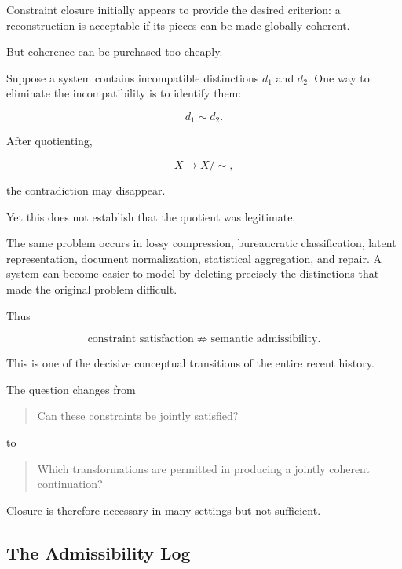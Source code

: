 \documentclass[11pt]{article}
\theoremstyle{remark}
\begin{document}
Constraint closure initially appears to provide the desired criterion: a reconstruction is acceptable if its pieces can be made globally coherent.

But coherence can be purchased too cheaply.

Suppose a system contains incompatible distinctions $d_1$ and $d_2$. One way to eliminate the incompatibility is to identify them:

\begin{equation}
d_1\sim d_2.
\end{equation}

After quotienting,

\begin{equation}
X
\longrightarrow
X/{\sim},
\end{equation}

the contradiction may disappear.

Yet this does not establish that the quotient was legitimate.

The same problem occurs in lossy compression, bureaucratic classification, latent representation, document normalization, statistical aggregation, and repair. A system can become easier to model by deleting precisely the distinctions that made the original problem difficult.

Thus

\begin{equation}
\text{constraint satisfaction}
\not\Rightarrow
\text{semantic admissibility}.
\end{equation}

This is one of the decisive conceptual transitions of the entire recent history.

The question changes from

\begin{quote}
Can these constraints be jointly satisfied?
\end{quote}

to

\begin{quote}
Which transformations are permitted in producing a jointly coherent continuation?
\end{quote}

Closure is therefore necessary in many settings but not sufficient.

\subsection{The Admissibility Log}
\end{document}

